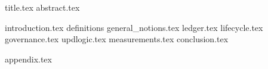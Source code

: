 \documentclass{llncs}
\begin{document}
{title.tex}
{abstract.tex}

{introduction.tex}
{definitions}
{general_notions.tex}
{ledger.tex}
{lifecycle.tex}
{governance.tex}
{updlogic.tex}
{measurements.tex}
{conclusion.tex}

\appendix
{appendix.tex}




\end{document}
